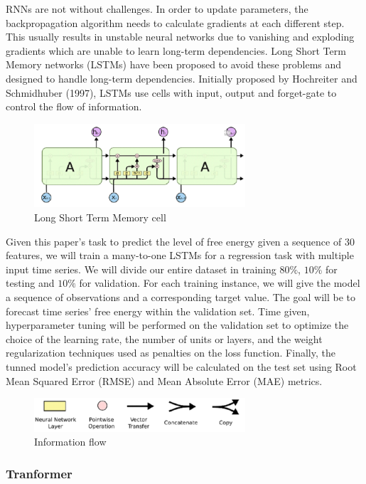 \documentclass{article}
\begin{document}
RNNs are not without challenges. In order to update parameters, the backpropagation algorithm needs to calculate gradients at each different step. This usually results in unstable neural networks due to vanishing and exploding gradients which are unable to learn long-term dependencies. Long Short Term Memory networks (LSTMs) have been proposed to avoid these problems and designed to handle long-term dependencies. Initially proposed by Hochreiter and Schmidhuber (1997),  LSTMs use cells with input, output and forget-gate to control the flow of information. 
\begin{figure}
    \caption{Long Short Term Memory cell}
    \includegraphics[width=0.7\textwidth]{images/2023-03-17-16-38-22.png}
\end{figure}



Given this paper's task to predict the level of free energy given a sequence of 30 features, we will train a many-to-one LSTMs for a regression task with multiple input time series. We will divide our entire dataset in training $80\%$, $10\%$ for testing and $10\%$ for validation. For each training instance, we will give the model a sequence of observations and a corresponding target value. The goal will be to forecast time series' free energy within the validation set. Time given, hyperparameter tuning will be performed on the validation set to optimize the choice of the learning rate, the number of units or layers, and the weight regularization techniques used as penalties on the loss function. Finally, the tunned model's prediction accuracy will be calculated on the test set using Root Mean Squared Error (RMSE) and Mean Absolute Error (MAE) metrics. 
\begin{figure}
    \caption{Information flow}
    \includegraphics[width=0.7\textwidth]{images/2023-03-17-16-41-25.png}
\end{figure}

\subsubsection{Tranformer}
\end{document}
